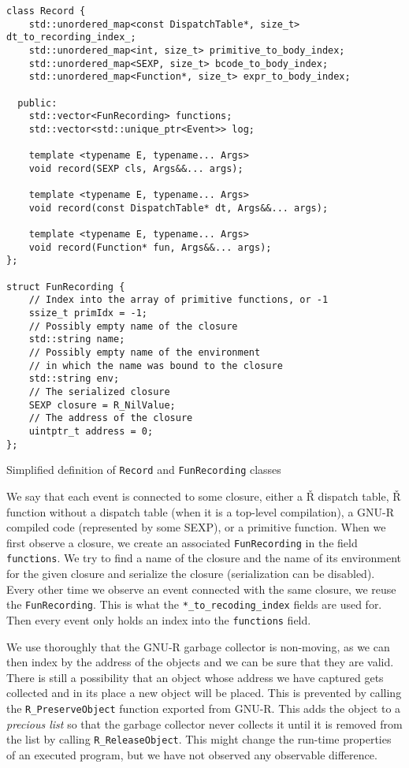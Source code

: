 \begin{listing}
	\begin{verbatim}
class Record {
    std::unordered_map<const DispatchTable*, size_t> dt_to_recording_index_;
    std::unordered_map<int, size_t> primitive_to_body_index;
    std::unordered_map<SEXP, size_t> bcode_to_body_index;
    std::unordered_map<Function*, size_t> expr_to_body_index;

  public:
    std::vector<FunRecording> functions;
    std::vector<std::unique_ptr<Event>> log;

    template <typename E, typename... Args>
    void record(SEXP cls, Args&&... args);

    template <typename E, typename... Args>
    void record(const DispatchTable* dt, Args&&... args);

    template <typename E, typename... Args>
    void record(Function* fun, Args&&... args);
};

struct FunRecording {
    // Index into the array of primitive functions, or -1
    ssize_t primIdx = -1;
    // Possibly empty name of the closure
    std::string name;
    // Possibly empty name of the environment
    // in which the name was bound to the closure
    std::string env;
    // The serialized closure
    SEXP closure = R_NilValue;
    // The address of the closure
    uintptr_t address = 0;
};
  \end{verbatim}
	\caption{Simplified definition of \texttt{Record} and \texttt{FunRecording} classes }\label{lst:record-class}
\end{listing}

We say that each event is connected to some closure, either a Ř dispatch table, Ř function without a dispatch table (when it is a top-level compilation), a GNU-R compiled code (represented by some SEXP), or a primitive function. When we first observe a closure, we create an associated \texttt{FunRecording} in the field \texttt{functions}. We try to find a name of the closure and the name of its environment for the given closure and serialize the closure (serialization can be disabled). Every other time we observe an event connected with the same closure, we reuse the \texttt{FunRecording}. This is what the \texttt{*\_to\_recoding\_index} fields are used for. Then every event only holds an index into the \texttt{functions} field.

We use thoroughly that the GNU-R garbage collector is non-moving, as we can then index by the address of the objects and we can be sure that they are valid. There is still a possibility that an object whose address we have captured gets collected and in its place a new object will be placed. This is prevented by calling the \texttt{R\_PreserveObject} function exported from GNU-R. This adds the object to a \textit{precious list} so that the garbage collector never collects it until it is removed from the list by calling \texttt{R\_ReleaseObject}. This might change the run-time properties of an executed program, but we have not observed any observable difference.

